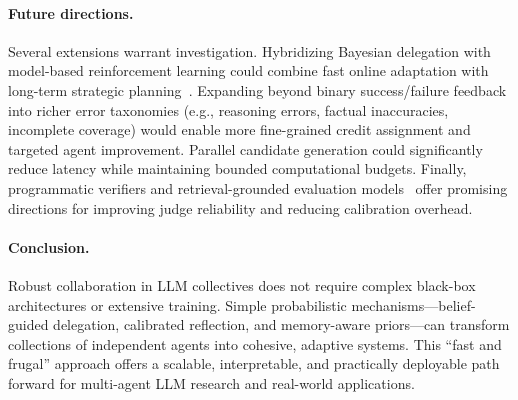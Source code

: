 \paragraph{Future directions.} Several extensions warrant investigation. Hybridizing Bayesian delegation with model-based reinforcement learning could combine fast online adaptation with long-term strategic planning~\cite{Silver17}. Expanding beyond binary success/failure feedback into richer error taxonomies (e.g., reasoning errors, factual inaccuracies, incomplete coverage) would enable more fine-grained credit assignment and targeted agent improvement. Parallel candidate generation could significantly reduce latency while maintaining bounded computational budgets. Finally, programmatic verifiers and retrieval-grounded evaluation models~\cite{min2023factscore} offer promising directions for improving judge reliability and reducing calibration overhead.

\paragraph{Conclusion.} Robust collaboration in LLM collectives does not require complex black-box architectures or extensive training. Simple probabilistic mechanisms---belief-guided delegation, calibrated reflection,
and memory-aware priors---can transform collections of independent agents into cohesive,
adaptive systems. This ``fast and frugal'' approach offers a scalable, interpretable, and practically deployable path forward for multi-agent LLM research and real-world applications.

